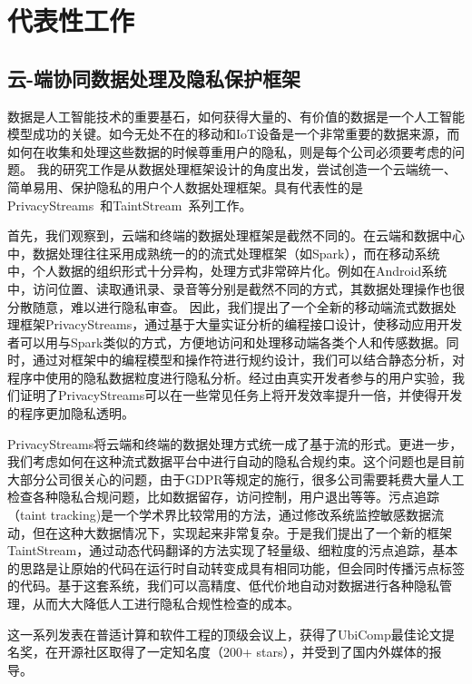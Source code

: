 \documentclass[12pt]{article}
\begin{document}
\section{代表性工作}

\subsection{云-端协同数据处理及隐私保护框架}

数据是人工智能技术的重要基石，如何获得大量的、有价值的数据是一个人工智能模型成功的关键。如今无处不在的移动和IoT设备是一个非常重要的数据来源，而如何在收集和处理这些数据的时候尊重用户的隐私，则是每个公司必须要考虑的问题。
我的研究工作是从数据处理框架设计的角度出发，尝试创造一个云端统一、简单易用、保护隐私的用户个人数据处理框架。具有代表性的是PrivacyStreams~\cite{li2017privacystreams}和TaintStream~\cite{yang2021taintstream}系列工作。

首先，我们观察到，云端和终端的数据处理框架是截然不同的。在云端和数据中心中，数据处理往往采用成熟统一的的流式处理框架（如Spark），而在移动系统中，个人数据的组织形式十分异构，处理方式非常碎片化。例如在Android系统中，访问位置、读取通讯录、录音等分别是截然不同的方式，其数据处理操作也很分散随意，难以进行隐私审查。
因此，我们提出了一个全新的移动端流式数据处理框架PrivacyStreams，通过基于大量实证分析的编程接口设计，使移动应用开发者可以用与Spark类似的方式，方便地访问和处理移动端各类个人和传感数据。同时，通过对框架中的编程模型和操作符进行规约设计，我们可以结合静态分析，对程序中使用的隐私数据粒度进行隐私分析。经过由真实开发者参与的用户实验，我们证明了PrivacyStreams可以在一些常见任务上将开发效率提升一倍，并使得开发的程序更加隐私透明。

PrivacyStreams将云端和终端的数据处理方式统一成了基于流的形式。更进一步，我们考虑如何在这种流式数据平台中进行自动的隐私合规约束。这个问题也是目前大部分公司很关心的问题，由于GDPR等规定的施行，很多公司需要耗费大量人工检查各种隐私合规问题，比如数据留存，访问控制，用户退出等等。污点追踪（taint tracking)是一个学术界比较常用的方法，通过修改系统监控敏感数据流动，但在这种大数据情况下，实现起来非常复杂。于是我们提出了一个新的框架TaintStream，通过动态代码翻译的方法实现了轻量级、细粒度的污点追踪，基本的思路是让原始的代码在运行时自动转变成具有相同功能，但会同时传播污点标签的代码。基于这套系统，我们可以高精度、低代价地自动对数据进行各种隐私管理，从而大大降低人工进行隐私合规性检查的成本。

这一系列发表在普适计算和软件工程的顶级会议上，获得了UbiComp最佳论文提名奖，在开源社区取得了一定知名度（200+ stars）\cite{privacystreams:code}，并受到了国内外媒体的报导。
\end{document}
